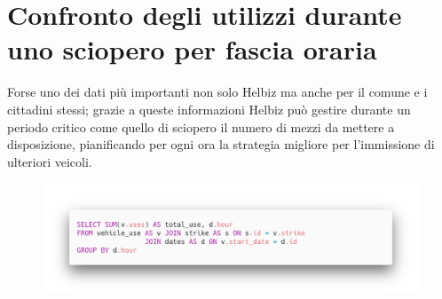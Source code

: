 \section{Confronto degli utilizzi durante uno sciopero per fascia oraria}
Forse uno dei dati più importanti non solo Helbiz ma anche per il comune e 
i cittadini stessi; grazie a queste informazioni Helbiz può gestire durante 
un periodo critico come quello di sciopero il numero di mezzi da mettere a disposizione,
pianificando per ogni ora la strategia migliore per l'immissione di ulteriori veicoli.
\begin{figure}[H]                                                                                                                                                            
\centering                                                                                                                                                                   
\includegraphics[width=\textwidth]{images/query3}                                                                                                                                   
\label{fig:query3}                                                                                                                                                           
\end{figure}

